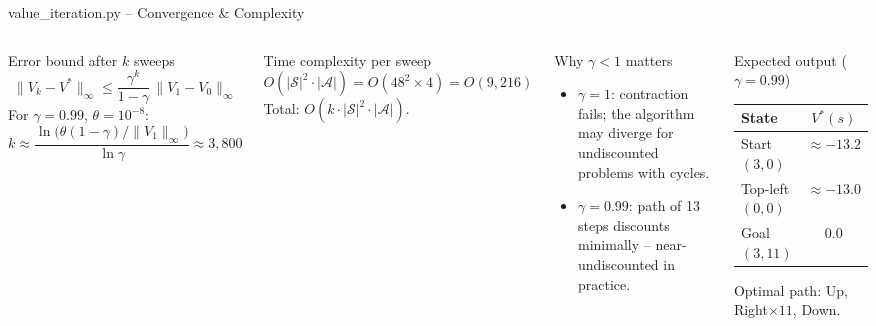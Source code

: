 \documentclass[aspectratio=169,8pt]{beamer}
\newcommand{\St}{\mathcal{S}}
\newcommand{\Act}{\mathcal{A}}
\newcommand{\Vopt}{V^{*}}
\begin{document}
\begin{frame}{value\_iteration.py -- Convergence \& Complexity}
  \begin{columns}[T]
    \begin{block}{Error bound after $k$ sweeps}
      \[
        \|V_k-\Vopt\|_\infty
        \leq
        \frac{\gamma^k}{1-\gamma}\,\|V_1-V_0\|_\infty
      \]
      For $\gamma=0.99$, $\theta=10^{-8}$:
      \[
        k\approx
        \frac{\ln\!\bigl(\theta(1-\gamma)/\|V_1\|_\infty\bigr)}
             {\ln\gamma}
        \approx 3{,}800
      \]
    \end{block}
    \begin{block}{Time complexity per sweep}
      \[
        O(|\St|^2\cdot|\Act|)
        =O(48^2\times4)=O(9{,}216)
      \]
      Total: $O(k\cdot|\St|^2\cdot|\Act|)$.
    \end{block}

    \begin{alertblock}{Why $\gamma<1$ matters}
      \begin{itemize}
        \item $\gamma=1$: contraction fails; the
          algorithm may diverge for undiscounted
          problems with cycles.
        \item $\gamma=0.99$: path of 13 steps
          discounts minimally -- near-undiscounted
          in practice.
      \end{itemize}
    \end{alertblock}
    \begin{block}{Expected output ($\gamma=0.99$)}
      \small
      \begin{tabular}{lc}
        \toprule
        State & $\Vopt(s)$ \\
        \midrule
        Start $(3,0)$    & $\approx-13.2$ \\
        Top-left $(0,0)$ & $\approx-13.0$ \\
        Goal  $(3,11)$   & $0.0$ \\
        \bottomrule
      \end{tabular}

      \medskip
      Optimal path: Up, Right$\times11$, Down.
    \end{block}
  \end{columns}
\end{frame}

\end{document}
